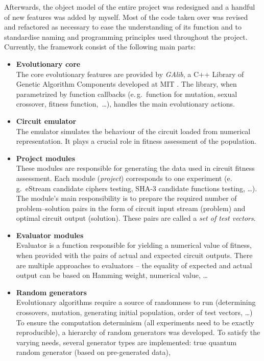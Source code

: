 \documentclass[12pt,twoside]{fithesis2}		%
\renewcommand{\_}{\leavevmode \kern0.0em\vbox{\hrule width0.4em}}
\newcommand{\squarebullet}{\textcolor{black}{\raisebox{0.15em}{\rule{4pt}{4pt}}}}
\newenvironment{myItemize}{
  \begin{itemize}[leftmargin=2em,rightmargin=1em,itemsep=\parskip ,parsep=0em,topsep=0em,partopsep=0em]
  \renewcommand{\labelitemi}{\squarebullet}
  \renewcommand{\labelitemii}{$\diamond$}
}{
  \end{itemize}
}
\begin{document}
Afterwards, the object model of the entire project was redesigned and a handful of new features was added by myself. 
Most of the code taken over was revised and refactored as necessary
to ease the understanding of its function and to standardise naming and programming principles used throughout the project. 
Currently, the framework consist of the following main parts:
\begin{myItemize}
\item \textbf{Evolutionary core}\\
The core evolutionary features are provided by \textit{GAlib}, a C++ Library of Genetic Algorithm 
Components developed at MIT \parencite{galib}.
The library, when parametrized by function callbacks (e.\,g.\ function for mutation, sexual crossover, fitness function,~\dots),
handles the main evolutionary actions.
\item \textbf{Circuit emulator}\\
The emulator simulates the behaviour of the circuit loaded from numerical representation. It plays a crucial role in
fitness assessment of the population.
\item \textbf{Project modules}\\
These modules are responsible for generating the data used in circuit fitness assessment. Each module (\textit{project}) corresponds
to one experiment (e.\,g.\ eStream candidate ciphers testing, SHA-3 candidate functions testing, \dots). The module's main
responsibility is to prepare the required number of problem--solution pairs in the form of circuit input stream (problem)
and optimal circuit output (solution). These pairs are called a \textit{set of test vectors}.
\item \textbf{Evaluator modules}\\
Evaluator is a function responsible for yielding a numerical value of fitness, when provided with the pairs of
actual and expected circuit outputs. There are multiple approaches to evaluators -- the equality of expected and
actual output can be based on Hamming weight, numerical value, \dots
\item \textbf{Random generators}\\
Evolutionary algorithms require a source of randomness to run (determining crossovers, mutation, generating initial population,
order of test vectors, \dots) To ensure the
computation determinism (all experiments need to be exactly reproducible), a hierarchy of random generators was developed.
To satisfy the varying needs, several generator types are implemented: true quantum random generator (based on pre-generated data),

\end{myItemize}
\end{document}
